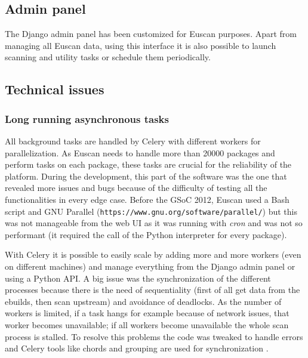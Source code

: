 \subsection{Admin panel}
The Django admin panel has been customized for Euscan purposes. Apart from managing all Euscan data, using this interface it is also possible to launch scanning and utility tasks or schedule them periodically.


\subsection{Technical issues}
\subsubsection{Long running asynchronous tasks}
All background tasks are handled by Celery with different workers for parallelization. As Euscan needs to handle more than 20000 packages and perform tasks on each package, these tasks are crucial for the reliability of the platform. During the development, this part of the software was the one that revealed more issues and bugs because of the difficulty of testing all the functionalities in every edge case. Before the GSoC 2012, Euscan used a Bash script and GNU Parallel (\texttt{https://www.gnu.org/software/parallel/}) but this was not manageable from the web UI as it was running with \emph{cron} and was not so performant (it required the call of the Python interpreter for every package).

With Celery it is possible to easily scale by adding more and more workers (even on different machines) and manage everything from the Django admin panel or using a Python API.
A big issue was the synchronization of the different processes because there is the need of sequentiality (first of all get data from the ebuilds, then scan upstream) and avoidance of deadlocks. As the number of workers is limited, if a task hangs for example because of network issues, that worker becomes unavailable; if all workers become unavailable the whole scan process is stalled. To resolve this problems the code was tweaked to handle errors and Celery tools like chords and grouping are used for synchronization \cite{celery_doc}.

